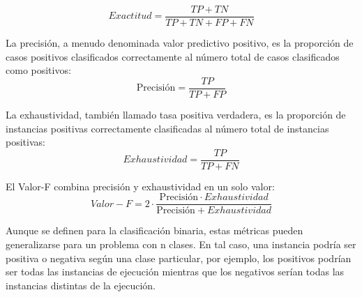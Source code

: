 \begin{equation}
Exactitud = \frac{TP + TN}{TP + TN + FP + FN}
\end{equation}

La precisión, a menudo denominada valor predictivo positivo, es la proporción de casos positivos clasificados correctamente al número total de casos clasificados como positivos:
\begin{equation}
\mbox{Precisión} = \frac{TP}{TP + FP}
\end{equation}

La exhaustividad, también llamado tasa positiva verdadera, es la proporción de instancias positivas correctamente clasificadas al número total de instancias positivas:
\begin{equation}
Exhaustividad = \frac{TP}{TP + FN}
\end{equation}


El Valor-F combina precisión y exhaustividad en un solo valor:
\begin{equation}
Valor-F = 2 \cdot \frac{\mbox{Precisión} \cdot Exhaustividad}{\mbox{Precisión} + Exhaustividad}
\end{equation}


Aunque se definen para la clasificación binaria, estas métricas pueden generalizarse para un problema con n clases. En tal caso, una instancia podría ser positiva o negativa según una clase particular, por ejemplo, los positivos podrían ser todas las instancias de ejecución mientras que los negativos serían todas las instancias distintas de la ejecución.
